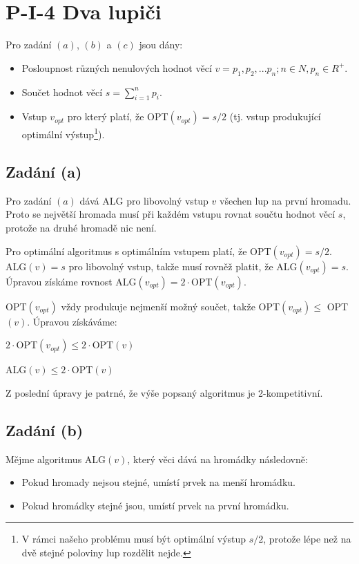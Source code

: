 \documentclass[a4paper, 12pt]{article}
\begin{document}
  \section{P-I-4 Dva lupiči}
  Pro zadání $(a)$, $(b)$ a $(c)$ jsou dány:
  \begin{itemize}[noitemsep, topsep=0pt]
    \item Posloupnost různých nenulových hodnot věcí $v=p_1, p_2,...p_n;n \in N, p_n \in R^+$.
    \item Součet hodnot věcí $s=\sum\limits_{i=1}^n p_i$.
    \item Vstup $v_{opt}$ pro který platí, že OPT$(v_{opt})=s/2$ (tj. vstup produkující optimální výstup\footnote{V rámci našeho problému musí být optimální výstup $s/2$, protože lépe než na dvě stejné poloviny lup rozdělit nejde.}).
  \end{itemize}

  \subsection{Zadání (a)}

  Pro zadání $(a)$ dává ALG pro libovolný vstup $v$ všechen lup na první hromadu. Proto se největší hromada musí při každém vstupu rovnat součtu hodnot věcí $s$, protože na druhé hromadě nic není.

  Pro optimální algoritmus s optimálním vstupem platí, že OPT$(v_{opt})=s/2$.
  ALG$(v)=s$ pro libovolný vstup, takže musí rovněž platit, že ALG$(v_{opt})=s$. Úpravou získáme rovnost ALG$(v_{opt}) = 2 \cdot$OPT$(v_{opt})$.

  OPT$(v_{opt})$ vždy produkuje nejmenší možný součet, takže OPT$(v_{opt}) \le$ OPT$(v)$. Úpravou získáváme:

  \begin{center}
    $2 \cdot$OPT$(v_{opt}) \le 2\cdot$OPT$(v)$

    ALG$(v) \le 2 \cdot$OPT$(v)$
  \end{center}

  Z poslední úpravy je patrné, že výše popsaný algoritmus je 2-kompetitivní.

  \subsection{Zadání (b)}
  Mějme algoritmus ALG$(v)$, který věci dává na hromádky následovně:
  \begin{itemize}[noitemsep, topsep=0pt]
    \item Pokud hromady nejsou stejné, umístí prvek na menší hromádku.
    \item Pokud hromádky stejné jsou, umístí prvek na první hromádku.
  \end{itemize}
\end{document}
